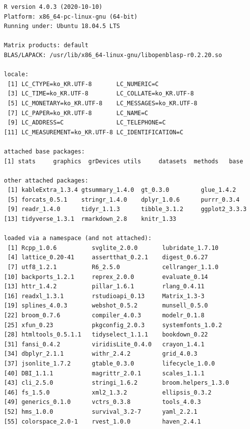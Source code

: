 \documentclass[
  11pt,
]{krantz}
\begin{document}
\begin{verbatim}
R version 4.0.3 (2020-10-10)
Platform: x86_64-pc-linux-gnu (64-bit)
Running under: Ubuntu 18.04.5 LTS

Matrix products: default
BLAS/LAPACK: /usr/lib/x86_64-linux-gnu/libopenblasp-r0.2.20.so

locale:
 [1] LC_CTYPE=ko_KR.UTF-8       LC_NUMERIC=C              
 [3] LC_TIME=ko_KR.UTF-8        LC_COLLATE=ko_KR.UTF-8    
 [5] LC_MONETARY=ko_KR.UTF-8    LC_MESSAGES=ko_KR.UTF-8   
 [7] LC_PAPER=ko_KR.UTF-8       LC_NAME=C                 
 [9] LC_ADDRESS=C               LC_TELEPHONE=C            
[11] LC_MEASUREMENT=ko_KR.UTF-8 LC_IDENTIFICATION=C       

attached base packages:
[1] stats     graphics  grDevices utils     datasets  methods   base     

other attached packages:
 [1] kableExtra_1.3.4 gtsummary_1.4.0  gt_0.3.0         glue_1.4.2      
 [5] forcats_0.5.1    stringr_1.4.0    dplyr_1.0.6      purrr_0.3.4     
 [9] readr_1.4.0      tidyr_1.1.3      tibble_3.1.2     ggplot2_3.3.3   
[13] tidyverse_1.3.1  rmarkdown_2.8    knitr_1.33      

loaded via a namespace (and not attached):
 [1] Rcpp_1.0.6          svglite_2.0.0       lubridate_1.7.10   
 [4] lattice_0.20-41     assertthat_0.2.1    digest_0.6.27      
 [7] utf8_1.2.1          R6_2.5.0            cellranger_1.1.0   
[10] backports_1.2.1     reprex_2.0.0        evaluate_0.14      
[13] httr_1.4.2          pillar_1.6.1        rlang_0.4.11       
[16] readxl_1.3.1        rstudioapi_0.13     Matrix_1.3-3       
[19] splines_4.0.3       webshot_0.5.2       munsell_0.5.0      
[22] broom_0.7.6         compiler_4.0.3      modelr_0.1.8       
[25] xfun_0.23           pkgconfig_2.0.3     systemfonts_1.0.2  
[28] htmltools_0.5.1.1   tidyselect_1.1.1    bookdown_0.22      
[31] fansi_0.4.2         viridisLite_0.4.0   crayon_1.4.1       
[34] dbplyr_2.1.1        withr_2.4.2         grid_4.0.3         
[37] jsonlite_1.7.2      gtable_0.3.0        lifecycle_1.0.0    
[40] DBI_1.1.1           magrittr_2.0.1      scales_1.1.1       
[43] cli_2.5.0           stringi_1.6.2       broom.helpers_1.3.0
[46] fs_1.5.0            xml2_1.3.2          ellipsis_0.3.2     
[49] generics_0.1.0      vctrs_0.3.8         tools_4.0.3        
[52] hms_1.0.0           survival_3.2-7      yaml_2.2.1         
[55] colorspace_2.0-1    rvest_1.0.0         haven_2.4.1        
\end{verbatim}

\normalsize
\end{document}
